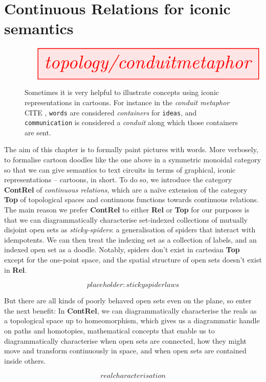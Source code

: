 \section{Continuous Relations for iconic semantics}

\begin{figure}[h!]
\centering
\[\resizebox{\textwidth}{!}{\tikzfig{topology/conduitmetaphor}}\]
\caption{Sometimes it is very helpful to illustrate concepts using iconic representations in cartoons. For instance in the \emph{conduit metaphor} \bR CITE \e, \texttt{words} are considered \emph{containers} for \texttt{ideas}, and \texttt{communication} is considered a \emph{conduit} along which those containers are sent.}
\end{figure}

The aim of this chapter is to formally paint pictures with words. More verbosely, to formalise cartoon doodles like the one above in a symmetric monoidal category so that we can give semantics to text circuits in terms of graphical, iconic representations -- cartoons, in short. To do so, we introduce the category \textbf{ContRel} of \emph{continuous relations}, which are a na\"{i}ve extension of the category \textbf{Top} of topological spaces and continuous functions towards continuous relations.\\

The main reason we prefer \textbf{ContRel} to either \textbf{Rel} or \textbf{Top} for our purposes is that we can diagrammatically characterise set-indexed collections of mutually disjoint open sets as \emph{sticky-spiders}: a generalisation of spiders that interact with idempotents. We can then treat the indexing set as a collection of labels, and an indexed open set as a doodle. Notably, spiders don't exist in cartesian \textbf{Top} except for the one-point space, and the spatial structure of open sets doesn't exist in \textbf{Rel}.

\[placeholder: stickyspider laws\]

But there are all kinds of poorly behaved open sets even on the plane, so enter the next benefit: In \textbf{ContRel}, we can diagrammatically characterise the reals as a topological space up to homeomorphism, which gives us a diagrammatic handle on paths and homotopies, mathematical concepts that enable us to diagrammatically characterise when open sets are connected, how they might move and transform continuously in space, and when open sets are contained inside others.

\[real characterisation\]

